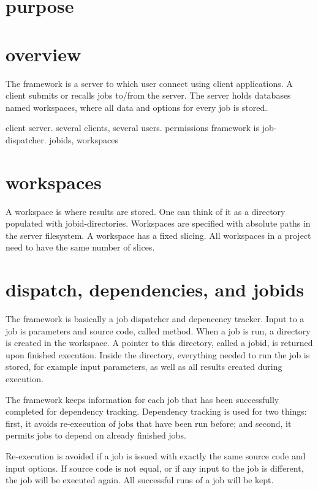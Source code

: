 
\section{purpose}




\section{overview}
The framework is a server to which user connect using client
applications.  A client submits or recalls jobs to/from the server.
The server holds databases named workspaces, where all data and
options for every job is stored.

client server.
several clients, several users.  permissions
framework is job-dispatcher.  jobids, workspaces





\section{workspaces}
A workspace is where results are stored.  One can think of it as a
directory populated with jobid-directories.
Workspaces are specified with absolute paths in the server filesystem.
A workspace has a fixed slicing.
All workspaces in a project need to have the same number of slices.



\section{dispatch, dependencies, and jobids}
The framework is basically a job dispatcher and depencency tracker.
Input to a job is parameters and source code, called method.  When a
job is run, a directory is created in the workspace.  A pointer to
this directory, called a jobid, is returned upon finished execution.
Inside the directory, everything needed to run the job is stored, for
example input parameters, as well as all results created during
execution.

The framework keeps information for each job that has been
successfully completed for dependency tracking.  Dependency tracking
is used for two things: first, it avoids re-execution of jobs that
have been run before; and second, it permits jobs to depend on already
finished jobs.

Re-execution is avoided if a job is issued with exactly the same
source code and input options.  If source code is not equal, or if any
input to the job is different, the job will be executed again.  All
successful runs of a job will be kept.

